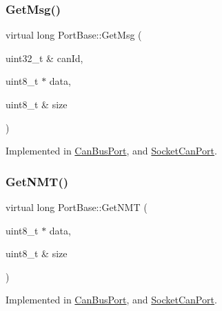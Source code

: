 \mbox{\label{classPortBase_a4fe82768f2b79889d7084292ac0e8696}} 
\subsubsection{\texorpdfstring{Get\+Msg()}{GetMsg()}}
{\footnotesize\ttfamily virtual long Port\+Base\+::\+Get\+Msg (\begin{DoxyParamCaption}\item[{uint32\+\_\+t \&}]{can\+Id,  }\item[{uint8\+\_\+t $\ast$}]{data,  }\item[{uint8\+\_\+t \&}]{size }\end{DoxyParamCaption})\hspace{0.3cm}{\ttfamily [pure virtual]}}



Implemented in \hyperlink{classCanBusPort_ac442e4e5b7bb154ea6322518b715f406}{Can\+Bus\+Port}, and \hyperlink{classSocketCanPort_aa9684efc602da057cb4928d52395af33}{Socket\+Can\+Port}.

\mbox{\label{classPortBase_abab2bf17b01d87c2bca01cb2151aa2f1}} 
\subsubsection{\texorpdfstring{Get\+N\+M\+T()}{GetNMT()}}
{\footnotesize\ttfamily virtual long Port\+Base\+::\+Get\+N\+MT (\begin{DoxyParamCaption}\item[{uint8\+\_\+t $\ast$}]{data,  }\item[{uint8\+\_\+t \&}]{size }\end{DoxyParamCaption})\hspace{0.3cm}{\ttfamily [pure virtual]}}



Implemented in \hyperlink{classCanBusPort_a41242dc7980ca398e4770813e50ef32b}{Can\+Bus\+Port}, and \hyperlink{classSocketCanPort_a2efe27bd3bb8c8127c89925e1e21535a}{Socket\+Can\+Port}.

\mbox{\label{classPortBase_a45ec4a2cd5e17e098f6f72677437f066}} 
